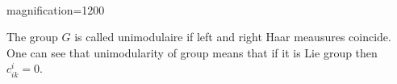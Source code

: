


\\magnification=1200
\def\r {{\bf r}}
\def\vare {\varepsilon}
\def\a {\alpha}


  The  group $G$ is called unimodulaire  if left and right Haar meausures
coincide. One can see that unimodularity of group means that
  if it is Lie group then   $c^i_{ik}=0$.


\bye 
